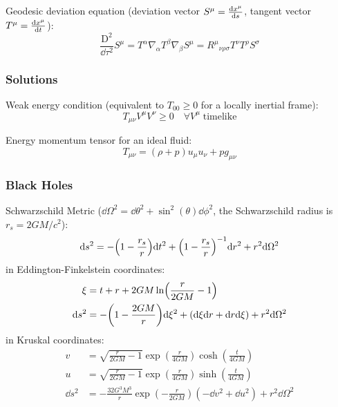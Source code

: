 			\noindent
			Geodesic deviation equation (deviation vector $S^\mu = \dv{x^\mu}{s}$, tangent vector $T^\mu = \dv{x^\mu}{t}$):
			\begin{equation}
				\frac{\mathrm{D}^2}{\dd \tau^2} S^\mu
				= T^\alpha \nabla_\alpha T^\beta \nabla_\beta S^\mu
				= R^\mu{}_{\nu\rho\sigma} T^\nu T^\rho S^\sigma
			\end{equation}


		\subsubsection{Solutions}
			Weak energy condition (equivalent to $T_{00} \ge 0$ for a locally inertial frame):
			\begin{equation}
				\label{Eq:WeakEnergyCondition}
				T_{\mu\nu} V^\mu V^\nu \ge 0 \quad \forall V^\mu\;\text{timelike}
			\end{equation}

			\noindent
			Energy momentum tensor for an ideal fluid:
			\begin{equation}
				T_{\mu\nu} = (\rho + p)u_\mu u_\nu + p g_{\mu\nu}
			\end{equation}

		\subsubsection{Black Holes}
			Schwarzschild Metric ($\dd \Omega^2 = \dd \theta^2 + \sin^2(\theta) \dd \phi^2$, the Schwarzschild radius is $r_s = 2 G M/c^2$):
			\begin{equation}
				\dd s^2 = - \qty(1-\frac{r_s}{r}) \dd t^2 + \qty(1 - \frac{r_s}{r})^{-1} \dd r^2 + r^2 \dd \Omega^2
			\end{equation}
			in Eddington-Finkelstein coordinates:
			\begin{equation}
				\begin{aligned}
					\xi &= t + r + 2 G M \ln(\frac{r}{2 G M} - 1) \\
					\dd s^2 &= -\qty(1-\frac{2 G M}{r}) \dd \xi^2 + (\dd \xi \dd r + \dd r \dd \xi) + r^2\dd \Omega^2
				\end{aligned}
			\end{equation}
			in Kruskal coordinates:
			\begin{equation}
				\begin{aligned}
					v &= \sqrt{\frac{r}{2 G M} - 1} \exp(\frac{r}{4 G M}) \cosh(\frac{t}{4 G M}) \\
					u &= \sqrt{\frac{r}{2 G M} - 1} \exp(\frac{r}{4 G M}) \sinh(\frac{t}{4 G M}) \\
					\dd s^2 &= -\frac{32 G^3 M^3}{r} \exp(-\frac{r}{2 G M}) (-\dd v^2 + \dd u^2) + r^2 \dd \Omega^2
				\end{aligned}
			\end{equation}


